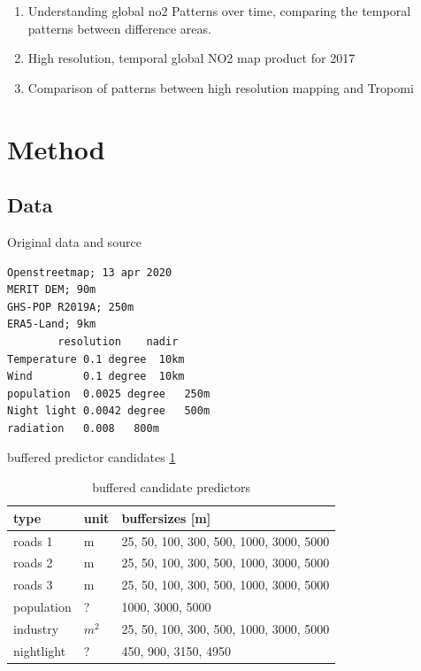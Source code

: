 \documentclass{article}
\begin{document}
 \begin{enumerate}
    
\item Understanding global no2
Patterns over time, comparing the temporal patterns between difference areas.

\item High resolution,  temporal global NO2 map product for 2017


\item
Comparison of patterns between high resolution mapping and Tropomi 

  

 \end{enumerate}


 

\section{Method}
\subsection{Data}

Original data and source
\begin{verbatim}
Openstreetmap; 13 apr 2020
MERIT DEM; 90m
GHS-POP R2019A; 250m
ERA5-Land; 9km
        resolution	  nadir
Temperature	0.1 degree	10km
Wind 	    0.1 degree	10km
population	0.0025 degree 	250m
Night light	0.0042 degree	500m
radiation	0.008	800m

\end{verbatim}



buffered predictor candidates \ref{tab-buff-pred}
  
\begin{table}\centering
\caption{buffered candidate predictors}
\label{tab-buff-pred}
\begin{tabular}{@{}lll@{}}\toprule
type & unit & buffersizes [m] \\ \midrule
roads 1 & m & 25, 50, 100, 300, 500, 1000, 3000, 5000 \\
roads 2 & m& 25, 50, 100, 300, 500, 1000, 3000, 5000 \\
roads 3 & m& 25, 50, 100, 300, 500, 1000, 3000, 5000 \\
population  &? & 1000, 3000, 5000 \\
industry  & $m^2$ & 25, 50, 100, 300, 500, 1000, 3000, 5000\\
nightlight   & ?& 450, 900, 3150, 4950\\
\bottomrule
\end{tabular}
\end{table}
\end{document}
